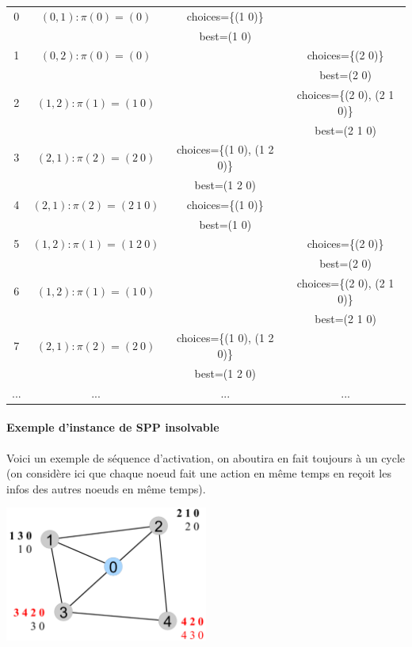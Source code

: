 \documentclass{article}
\begin{document}
\begin{sffamily}
\begin{tabular}{|c|c|c|c|}
  \hline
  0 & $(0, 1): \pi(0) = (0)$ & choices=\{(1 0)\} & \\
  & & best=(1 0) & \\
  \hline
  1 & $(0, 2): \pi(0) = (0)$ & & choices=\{(2 0)\} \\
  & & & best=(2 0) \\
  \hline
  2 & $(1, 2): \pi(1) = (1\ 0)$ & & choices=\{(2 0), (2 1 0)\} \\
  & & & best=(2 1 0) \\
  \hline
  3 & $(2, 1): \pi(2) = (2\ 0)$ & choices=\{(1 0), (1 2 0)\} & \\
  & & best=(1 2 0) & \\
  \hline
  4 & $(2, 1): \pi(2) = (2\ 1\ 0)$ & choices=\{(1 0)\} & \\
  & & best=(1 0) & \\
  \hline
  5 & $(1, 2): \pi(1) = (1\ 2\ 0)$ & & choices=\{(2 0)\} \\
  & & & best=(2 0) \\
  \hline
  6 & $(1, 2): \pi(1) = (1\ 0)$ & & choices=\{(2 0), (2 1 0)\} \\
  & & & best=(2 1 0) \\
  \hline
  7 & $(2, 1): \pi(2) = (2\ 0)$ & choices=\{(1 0), (1 2 0)\} & \\
  & & best=(1 2 0) & \\
  \hline
  ... & ... & ... & ... \\
\end{tabular}

\paragraph{Exemple d'instance de SPP insolvable}

Voici un exemple de séquence d'activation, on aboutira en fait
toujours à un cycle (on considère ici que chaque noeud fait une action
en même temps en reçoit les infos des autres noeuds en même temps).

\includegraphics[width=0.5\textwidth]{fab_019.pdf}


\end{sffamily}
\end{document}
